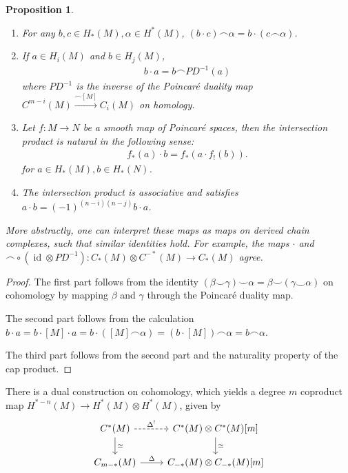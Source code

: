 \documentclass{scrartcl}
\theoremstyle{plain}
\newtheorem{proposition}[theorem]{Proposition}
\theoremstyle{definition}
\newcommand{\capp}{\mathbin{\frown}}
\newcommand{\cupp}{\mathbin{\smile}}
\newcommand{\quiso}{\simeq}
\let\xto\xrightarrow
\DeclareMathOperator{\id}{id}
\newcommand{\comp}{\mathbin{\circ}}
\begin{document}
\begin{proposition}\label{prop:isect-naturality}
    \begin{enumerate}
        \item For any $b, c \in H_*(M), \alpha\in H^*(M)$, $(b\cdot c)\capp \alpha = b\cdot (c\capp \alpha)$.
        \item If $a\in H_i(M)$ and $b\in H_j(M)$,
        \begin{align*}
            b\cdot a = b\capp PD^{-1}(a)
        \end{align*}
        where $PD^{-1}$ is the inverse of the Poincaré duality map $C^{m-i}(M)\xto{\capp [M]} C_{i}(M)$ on homology.
        \item Let $f\colon M\to N$ be a smooth map of Poincaré spaces, then the intersection product is natural in the following sense: 
        \begin{align*}
            f_*(a) \cdot b = f_*(a \cdot f_!(b)).
        \end{align*}
        for $a\in H_*(M), b\in H_*(N)$.
        \item The intersection product is associative and satisfies $a\cdot b = (-1)^{(n-i)(n-j)}b\cdot a$.
    \end{enumerate}
    More abstractly, one can interpret these maps as maps on derived chain complexes, such that similar identities hold. For example, the maps $\cdot$ and $\capp \comp (\id\otimes PD^{-1})\colon C_*(M) \otimes C^{-*}(M) \to C_{*}(M)$ agree. 
\end{proposition}
\begin{proof}
    The first part follows from the identity $(\beta\cupp \gamma) \cupp \alpha = \beta \cupp (\gamma \cupp \alpha)$ on cohomology by mapping $\beta$ and $\gamma$ through the Poincaré duality map. 

    The second part follows from the calculation $b\cdot a = b\cdot [M]\cdot a = b\cdot ([M]\capp \alpha) = (b\cdot [M]) \capp \alpha = b\capp \alpha$. 

    The third part follows from the second part and the naturality property of the cap product. 
\end{proof}


There is a dual construction on cohomology, which yields a degree $m$ coproduct map $H^{*-n}(M)\to H^*(M)\otimes H^*(M)$, given by 
\begin{equation}
    \begin{tikzcd}
        C^*(M) \dar["\quiso"]\rar[dashed, "\Delta^!"] & C^*(M)\otimes C^*(M)[m] \dar["\quiso"]\\
        C_{m-*}(M)  \rar["\Delta"] & C_{-*}(M)\otimes C_{-*}(M)[m]
    \end{tikzcd}
\end{equation}
\end{document}
